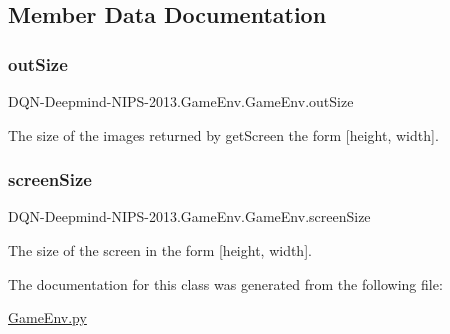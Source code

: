 \subsection{Member Data Documentation}
\hypertarget{classDQN-Deepmind-NIPS-2013_1_1GameEnv_1_1GameEnv_ae8e7e56bd996ea0ce4ece1ca32f6b54a}{}\label{classDQN-Deepmind-NIPS-2013_1_1GameEnv_1_1GameEnv_ae8e7e56bd996ea0ce4ece1ca32f6b54a} 
\subsubsection{\texorpdfstring{out\+Size}{outSize}}
{\footnotesize\ttfamily D\+QN-\/Deepmind-\/N\+I\+PS-\/2013.Game\+Env.\+Game\+Env.\+out\+Size}



The size of the images returned by get\+Screen the form \mbox{[}height, width\mbox{]}. 

\hypertarget{classDQN-Deepmind-NIPS-2013_1_1GameEnv_1_1GameEnv_a2dedb2f4e5f0f1b7da2970ac89a5b544}{}\label{classDQN-Deepmind-NIPS-2013_1_1GameEnv_1_1GameEnv_a2dedb2f4e5f0f1b7da2970ac89a5b544} 
\subsubsection{\texorpdfstring{screen\+Size}{screenSize}}
{\footnotesize\ttfamily D\+QN-\/Deepmind-\/N\+I\+PS-\/2013.Game\+Env.\+Game\+Env.\+screen\+Size}



The size of the screen in the form \mbox{[}height, width\mbox{]}. 



The documentation for this class was generated from the following file\+:\begin{DoxyCompactItemize}
\item 
\hyperlink{GameEnv_8py}{Game\+Env.\+py}\end{DoxyCompactItemize}
